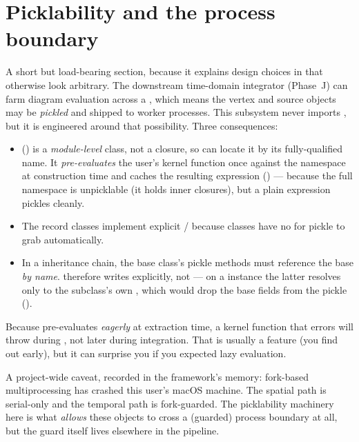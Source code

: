 \section{Picklability and the process boundary}\label{sec:pickle}

A short but load-bearing section, because it explains design choices in
 that otherwise look arbitrary. The downstream time-domain
integrator (Phase~J) can farm diagram evaluation across a
, which means the vertex and source objects may be
\emph{pickled} and shipped to worker processes. This subsystem never imports
, but it is engineered around that possibility. Three
consequences:

\begin{itemize}
  \item {} () is a \emph{module-level}
        class, not a closure, so  can locate it by its fully-qualified
        name. It \emph{pre-evaluates} the user's kernel function once against the
        namespace at construction time and caches the resulting  expression
        () --- because the full namespace is unpicklable (it
        holds inner closures), but a plain  expression pickles cleanly.
  \item The record classes implement explicit
        / because 
        classes have no  for pickle to grab automatically.
  \item In a  inheritance chain, the base class's pickle methods
        must reference the base  \emph{by name}.
         therefore writes
         explicitly, not  ---
        on a  instance the latter resolves only to the
        subclass's own , which would drop the base fields
        from the pickle ().
\end{itemize}

\begin{gotcha}
Because  pre-evaluates \emph{eagerly} at extraction time,
a kernel function that errors will throw during , not
later during integration. That is usually a feature (you find out early), but it can
surprise you if you expected lazy evaluation.

A project-wide caveat, recorded in the framework's memory: fork-based multiprocessing
has crashed this user's macOS machine. The spatial path is serial-only and the
temporal path is fork-guarded. The picklability machinery here is what \emph{allows}
these objects to cross a (guarded) process boundary at all, but the guard itself lives
elsewhere in the pipeline.
\end{gotcha}

